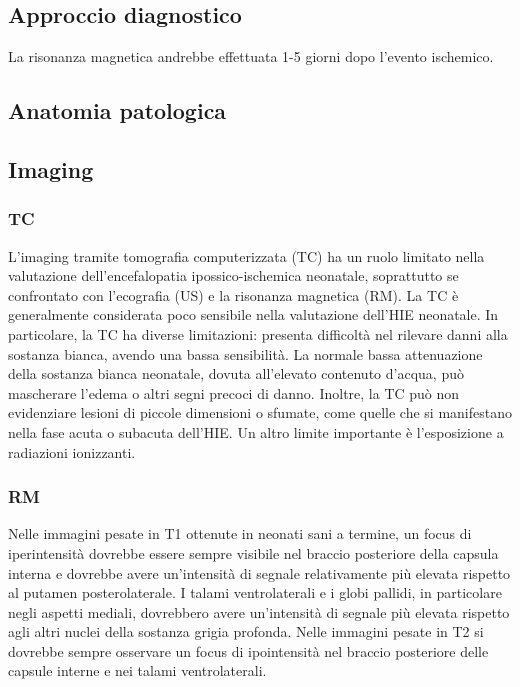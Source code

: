 \subsection{Approccio diagnostico}

La risonanza magnetica andrebbe effettuata 1-5 giorni dopo l'evento ischemico.

\subsection{Anatomia patologica}

\subsection{Imaging}

\subsubsection{TC}

L'imaging tramite tomografia computerizzata (TC) ha un ruolo limitato nella valutazione dell'encefalopatia ipossico-ischemica neonatale, soprattutto se confrontato con l'ecografia (US) e la risonanza magnetica (RM).
La TC è generalmente considerata poco sensibile nella valutazione dell'HIE neonatale. In particolare, la TC ha diverse limitazioni: presenta difficoltà nel rilevare danni alla sostanza bianca, avendo una bassa sensibilità. La normale bassa attenuazione della sostanza bianca neonatale, dovuta all'elevato contenuto d'acqua, può mascherare l'edema o altri segni precoci di danno. Inoltre, la TC può non evidenziare lesioni di piccole dimensioni o sfumate, come quelle che si manifestano nella fase acuta o subacuta dell'HIE. Un altro limite importante è l'esposizione a radiazioni ionizzanti.

\subsubsection{RM}
Nelle immagini pesate in T1 ottenute in neonati sani a termine, un focus di iperintensità dovrebbe essere sempre visibile nel braccio posteriore della capsula interna e dovrebbe avere un'intensità di segnale relativamente più elevata rispetto al putamen posterolaterale. I talami ventrolaterali e i globi pallidi, in particolare negli aspetti mediali, dovrebbero avere un'intensità di segnale più elevata rispetto agli altri nuclei della sostanza grigia profonda. Nelle immagini pesate in T2  si dovrebbe sempre osservare un focus di ipointensità nel braccio posteriore delle capsule interne e nei talami ventrolaterali.


